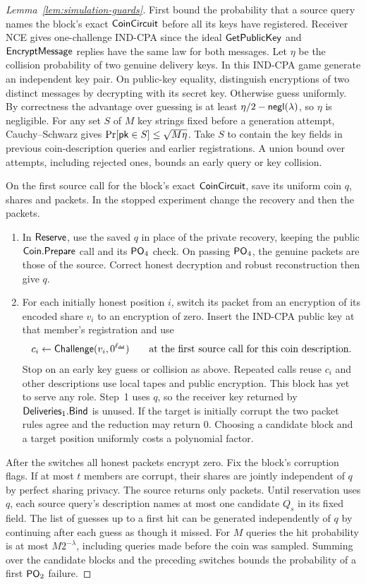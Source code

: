 \begin{proof}[Lemma~\ref{lem:simulation-guards}]
First bound the probability that a source query names the block's exact
$\mathsf{CoinCircuit}$ before all its keys have registered.  Receiver NCE gives one-challenge IND-CPA since
the ideal $\mathsf{GetPublicKey}$ and $\mathsf{EncryptMessage}$ replies have the same
law for both messages.  Let $\eta$ be the collision
probability of two genuine delivery keys.  In this IND-CPA game generate
an independent key pair. On public-key equality, distinguish encryptions
of two distinct messages by decrypting with its secret key. Otherwise
guess uniformly. By correctness the advantage over guessing is at least
$\eta/2-\mathop{\mathsf{negl}}(\lambda)$, so $\eta$ is negligible.  For any set $S$ of $M$ key strings fixed before
a generation attempt, Cauchy--Schwarz gives
$\Pr[\mathsf{pk}\in S]\leq\sqrt{M\eta}$.  Take $S$ to contain the key fields
in previous coin-description queries and earlier registrations.  A union
bound over attempts, including rejected ones, bounds an early query
or key collision.

On the first source call for the block's exact $\mathsf{CoinCircuit}$, save
its uniform coin $q$, shares and packets.  In the stopped experiment
change the recovery and then the packets.
\begin{enumerate}
\item In $\mathsf{Reserve}$, use the saved $q$ in place of the private recovery,
keeping the public $\mathsf{Coin}.\mathsf{Prepare}$ call and its $\mathsf{PO}_{4}$ check.
On passing $\mathsf{PO}_{4}$, the genuine packets are those of the source.
Correct honest decryption and robust reconstruction then give $q$.
\item For each initially honest position $i$, switch its packet from an
encryption of its encoded share $v_i$ to an encryption of zero.  Insert
the IND-CPA public key at that member's registration and use
\[
  c_i\gets\mathsf{Challenge}(v_i,0^{\ell_{\mathsf{del}}})
  \qquad\text{at the first source call for this coin description.}
\]
Stop on an early key guess or collision as above.  Repeated calls reuse
$c_i$ and other descriptions use local tapes and public encryption.
This block has yet to serve any role.  Step~1 uses $q$, so
the receiver key returned by $\mathsf{Deliveries}_1.\mathsf{Bind}$ is unused.
If the target is initially corrupt the two packet rules agree and the
reduction may return $0$.  Choosing a candidate block and a target position uniformly costs
a polynomial factor.
\end{enumerate}
After the switches all honest packets encrypt zero.  Fix the block's
corruption flags.  If at most $t$ members are corrupt, their shares
are jointly independent of $q$ by perfect sharing privacy.
The source returns only packets.
Until reservation uses $q$, each source query's description names at
most one candidate $Q_s$ in its fixed field.  The list of guesses up to a
first hit can be generated independently of $q$ by continuing after each
guess as though it missed.  For $M$ queries the hit probability is at
most $M2^{-\lambda}$, including queries made before the coin was sampled.
Summing over the candidate blocks and the preceding switches bounds
the probability of a first $\mathsf{PO}_{2}$ failure.


\end{proof}
